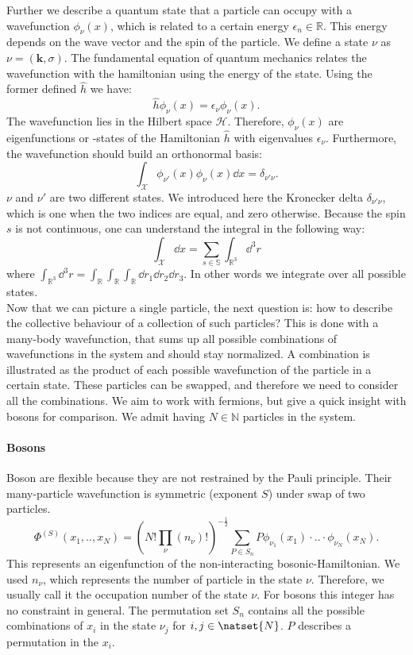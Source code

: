 \documentclass[../main.tex]{subfile}
\begin{document}
Further we describe a quantum state that a particle can occupy with a wavefunction $\phi_{\nu}(x)$, 
which is related to a certain energy $\epsilon_n \in\mathbb{R}$. This energy depends on 
the wave vector and the spin of the particle. We define a state $\nu$ as $\nu = (\bm{k}, \sigma)$. The fundamental equation of
quantum mechanics relates the wavefunction with the hamiltonian using the energy of the state. Using the former defined $\hat{h}$ we have:
\[
    \hat{h} \phi_{\nu}(x) = \epsilon_\nu \phi_{\nu}(x).
\]
The wavefunction lies in the Hilbert space $\mathcal{H}$. Therefore, $\phi_{\nu}(x)$ are eigenfunctions or -states of
the Hamiltonian $\hat{h}$ with eigenvalues $\epsilon_{\nu}$. Furthermore, the wavefunction should build an orthonormal basis:
\[
    \int_\mathcal{X} \phi_{\nu'}(x) \phi_{\nu}(x) \dd x = \delta_{\nu'\nu}.
\]
$\nu$ and $\nu'$ are two different states. We introduced here the Kronecker delta $\delta_{\nu'\nu}$, which is one when the two indices
are equal, and zero otherwise. Because the spin $s$ is not continuous, one can understand the integral in the following way:
\[
    \int_\mathcal{X} \dd x = \sum_{s\in \mathbb{S}} \int_{\mathbb{R}^3} \dd^3 r
\]  
where $ \int_{\mathbb{R}^3}\dd^3 r = \int_{\mathbb{R}}\int_{\mathbb{R}}\int_{\mathbb{R}} \dd r_1 \dd r_2 \dd r_3$.
In other words we integrate over all possible states.\\

Now that we can picture a single particle, the next question is: how to describe the collective behaviour of a collection of such particles?
This is done with a many-body wavefunction, that sums up all possible combinations of wavefunctions in the system and should stay normalized. 
A combination is illustrated as the product of each possible wavefunction of the particle in a certain state. These particles
can be swapped, and therefore we need to consider all the combinations.
We aim to work with fermions, but give a quick insight with bosons for comparison. We admit having $N \in \mathbb{N}$ particles in the system.\\

\paragraph{Bosons}$~$\\

Boson are flexible because they are not restrained by the Pauli principle.
Their many-particle wavefunction is symmetric (exponent $S$) under swap of two particles.
\[
    \Phi^{(S)}(x_1,..,x_N) = \left(N!\prod_{\nu}(n_{\nu})!\right)^{-\frac{1}{2}} \sum_{P\in S_n} P \phi_{\nu_1}(x_1)\cdot ..\cdot \phi_{\nu_N}(x_N).
\]
This represents an eigenfunction of the non-interacting bosonic-Hamiltonian.
We used $n_{\nu}$, which represents the number of particle in the state $\nu$. Therefore, we usually call it the occupation number of the state $\nu$.
For bosons this integer has no constraint in general.
The permutation set $S_n$ contains all the possible combinations of $x_i$ in the state $\nu_j$ for $i,j\in\natset{N}$. $P$ describes a permutation
in the $x_i$.\\
\end{document}
